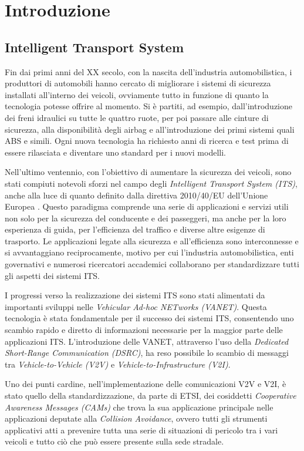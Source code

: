 \chapter{Introduzione}

\section{Intelligent Transport System}
Fin dai primi anni del XX secolo, con la nascita dell'industria automobilistica, i produttori di automobili hanno cercato di migliorare i sistemi di sicurezza installati all'interno dei veicoli, ovviamente tutto in funzione di quanto la tecnologia potesse offrire al momento. Si è partiti, ad esempio, dall'introduzione dei freni idraulici su tutte le quattro ruote, per poi passare alle cinture di sicurezza, alla disponibilità degli airbag e all'introduzione dei primi sistemi quali ABS e simili. Ogni nuova tecnologia ha richiesto anni di ricerca e test prima di essere rilasciata e diventare uno standard per i nuovi modelli.

Nell'ultimo ventennio, con l'obiettivo di aumentare la sicurezza dei veicoli, sono stati compiuti notevoli sforzi nel campo degli \textit{Intelligent Transport System (ITS)}, anche alla luce di quanto definito dalla direttiva 2010/40/EU dell'Unione Europea \cite{2010-40}. Questo paradigma comprende una serie di applicazioni e servizi utili non solo per la sicurezza del conducente e dei passeggeri, ma anche per la loro esperienza di guida, per l'efficienza del traffico e diverse altre esigenze di trasporto. Le applicazioni legate alla sicurezza e all'efficienza sono interconnesse e si avvantaggiano reciprocamente, motivo per cui l'industria automobilistica, enti governativi e numerosi ricercatori accademici collaborano per standardizzare tutti gli aspetti dei sistemi ITS.

I progressi verso la realizzazione dei sistemi ITS sono stati alimentati da importanti sviluppi nelle \textit{Vehicular Ad-hoc NETworks (VANET)}. Questa tecnologia è stata fondamentale per il successo dei sistemi ITS, consentendo uno scambio rapido e diretto di informazioni necessarie per la maggior parte delle applicazioni ITS. L'introduzione delle VANET, attraverso l'uso della \textit{Dedicated Short-Range Communication (DSRC)}, ha reso possibile lo scambio di messaggi tra \textit{Vehicle-to-Vehicle (V2V)} e \textit{Vehicle-to-Infrastructure (V2I)}.

Uno dei punti cardine, nell'implementazione delle comunicazioni V2V e V2I, è stato quello della standardizzazione, da parte di ETSI, dei cosiddetti \textit{Cooperative Awareness Messages (CAMs)} che trova la sua applicazione principale nelle applicazioni deputate alla \textit{Collision Avoidance}, ovvero tutti gli strumenti applicativi atti a prevenire tutta una serie di situazioni di pericolo tra i vari veicoli e tutto ciò che può essere presente sulla sede stradale.

